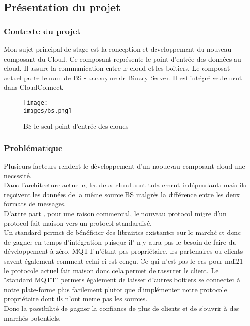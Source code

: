         \subsection{Présentation du projet}
        \subsubsection{Contexte du projet}
            Mon sujet principal de stage est la conception et développement du nouveau composant du Cloud. Ce composant représente 
            le point d'entrée des données au cloud. Il assure la communication entre le cloud et les boitiers. 
            Le composat actuel porte le nom de \gls{BS} - acronyme de Binary Server. Il est intégré seulement dans CloudConnect.
            \begin{figure}[ht]
                \centering
                \texttt{[image: \\images/bs.png]}
                \caption{BS le seul point d'entrée des clouds }
            \end{figure}
           
        \subsubsection{Problématique}
            Plusieurs facteurs  rendent le développement d'un noouevau composant cloud une necessité. 
            \\Dans l’architecture actuelle, les deux cloud sont totalement indépendants mais ils reçoivent les données 
            de la même source \gls{BS} malgrès la différence entre les deux formats de messages. \\ 

            D'autre part , pour une raison commercial, le nouveau protocol migre d'un protocol fait maison vers un protocol standardisé. \\
            Un standard permet de bénéficier des librairies existantes sur le marché et donc de gagner en temps d'intégration puisque 
            il' n y aura pas le besoin de faire du développement à zéro.
            MQTT n'étant pas propriétaire, les partenaires ou clients savent également comment celui-ci est conçu. Ce qui n'est pas le cas 
            pour \gls{mdi21} \- le protocole actuel fait maison \-  donc cela permet de rassurer le client. 
            Le "standard MQTT" permets également de laisser d'autres boitiers se connecter à notre plate-forme plus facilement 
            plutot que d'implémenter notre protocole propriétaire dont ils n'ont meme pas les sources. \\
            Donc la possibilité de gagner la confiance de plus de clients et de s'ouvrir à des marchés potentiels.


